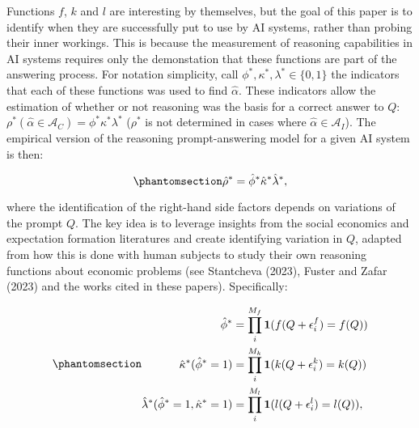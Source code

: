 \documentclass[
]{article}
\begin{document}
Functions \(f\), \(k\) and \(l\) are interesting by themselves, but the
goal of this paper is to identify when they are successfully put to use
by AI systems, rather than probing their inner workings. This is because
the measurement of reasoning capabilities in AI systems requires only
the demonstation that these functions are part of the answering process.
For notation simplicity, call
\(\phi^*, \kappa^*, \lambda^* \in \{0, 1\}\) the indicators that each of
these functions was used to find \(\hat{\alpha}\). These indicators
allow the estimation of whether or not reasoning was the basis for a
correct answer to \(Q\):
\(\rho^*(\hat{\alpha} \in \mathcal{A}_C) = \phi^* \kappa^* \lambda^*\)
(\(\rho^*\) is not determined in cases where
\(\hat{\alpha} \in \mathcal{A}_I\)). The empirical version of the
reasoning prompt-answering model for a given AI system is then:

\begin{equation}\phantomsection\label{eq-empiric}{
\hat{\rho}^* = \hat{\phi}^* \hat{\kappa}^* \hat{\lambda}^*,
}\end{equation}

where the identification of the right-hand side factors depends on
variations of the prompt \(Q\). The key idea is to leverage insights
from the social economics and expectation formation literatures and
create identifying variation in \(Q\), adapted from how this is done
with human subjects to study their own reasoning functions about
economic problems (see Stantcheva (2023), Fuster and Zafar (2023) and
the works cited in these papers). Specifically:

\begin{equation}\phantomsection\label{eq-empiricsyst}{
\begin{aligned}
\hat{\phi}^* &= \prod_{i}^{M_f} \mathbf{1}(f(Q + \epsilon_i^f) = f(Q)) \\
\hat{\kappa}^*(\hat{\phi}^*=1) &= \prod_{i}^{M_k} \mathbf{1}(k(Q + \epsilon_i^k) = k(Q)) \\
\hat{\lambda}^*(\hat{\phi}^* =1,\hat{\kappa}^*=1) &= \prod_{i}^{M_l} \mathbf{1}(l(Q + \epsilon_i^l) = l(Q)),
\end{aligned}
}\end{equation}
\end{document}
